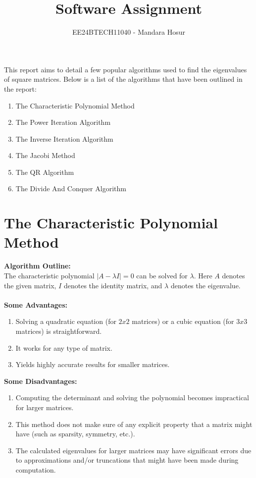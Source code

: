 \documentclass[journal,12pt,twocolumn]{IEEEtran}
\theoremstyle{remark}
\begin{document}

\vspace{3cm}

\title{Software Assignment}
\author{EE24BTECH11040 - Mandara Hosur}
\maketitle
\newpage
\bigskip

\renewcommand{\thefigure}{\theenumi}
\renewcommand{\thetable}{\theenumi}

This report aims to detail a few popular algorithms used to find the eigenvalues of square matrices. 
Below is a list of the algorithms that have been outlined in the report:
\begin{enumerate}
\item The Characteristic Polynomial Method
\item The Power Iteration Algorithm
\item The Inverse Iteration Algorithm
\item The Jacobi Method
\item The QR Algorithm
\item The Divide And Conquer Algorithm
\end{enumerate}

\section{The Characteristic Polynomial Method}
\textbf{Algorithm Outline:}
\\
The characteristic polynomial $|A-\lambda I| = 0$ can be solved for $\lambda$. Here $A$ denotes the given matrix, $I$ denotes the identity matrix, and $\lambda$ denotes the eigenvalue.
\\ \\
\textbf{Some Advantages:}
\begin{enumerate}
\item Solving a quadratic equation (for $2x2$ matrices) or a cubic equation (for $3x3$ matrices) is straightforward.
\item It works for any type of matrix.
\item Yields highly accurate results for smaller matrices.
\end{enumerate}
\textbf{Some Disadvantages:}
\begin{enumerate}
\item Computing the determinant and solving the polynomial becomes impractical for larger matrices.
\item This method does not make sure of any explicit property that a matrix might have (such as sparsity, symmetry, etc.).
\item The calculated eigenvalues for larger matrices may have significant errors due to approximations and/or truncations that might have been made during computation. 
\end{enumerate}
\end{document}
